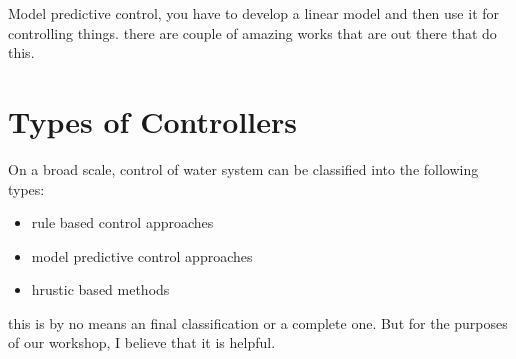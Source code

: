 \documentclass{article}
\begin{document}
Model predictive control, you have to develop a linear model and then use it for controlling things.
there are couple of amazing works that are out there that do this. 

\section{Types of Controllers}

On a broad scale, control of water system can be classified into the following types:

\begin{itemize}
	\item rule based control approaches
	\item model predictive control approaches
	\item hrustic based methods
\end{itemize}

this is by no means an final classification or a complete one. But for the purposes of our workshop, I believe that it is helpful. 
\end{document}
